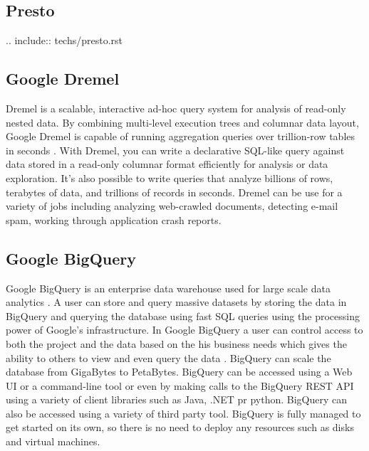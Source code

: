 \subsection{ Presto}

     .. include:: techs/presto.rst

\subsection{ Google Dremel}
 
     Dremel is a scalable, interactive ad-hoc query system for
     analysis of read-only nested data. By combining multi-level
     execution trees and columnar data layout, Google Dremel is
     capable of running aggregation queries over trillion-row tables
     in seconds \cite{paper-dremel}. With Dremel, you can write a
     declarative SQL-like query against data stored in a read-only
     columnar format efficiently for analysis or data exploration.
     It's also possible to write queries that analyze billions of
     rows, terabytes of data, and trillions of records in
     seconds. Dremel can be use for a variety of jobs including
     analyzing web-crawled documents, detecting e-mail spam, working
     through application crash reports.

\subsection{ Google BigQuery}


     Google BigQuery \cite{www-bigquery} is an enterprise data
     warehouse used for large scale data
     analytics \cite{www-bigquery-documentation}. A user can store
     and query massive datasets by storing the data in BigQuery and
     querying the database using fast SQL queries using the processing
     power of Google's infrastructure. In Google BigQuery a user can
     control access to both the project and the data based on the his
     business needs which gives the ability to others to view and even
     query the data \cite{www-bigquery}. BigQuery can scale the
     database from GigaBytes to PetaBytes. BigQuery can be accessed
     using a Web UI or a command-line tool or even by making calls to
     the BigQuery REST API using a variety of client libraries such as
     Java, .NET pr python. BigQuery can also be accessed using a
     variety of third party tool. BigQuery is fully managed to get
     started on its own, so there is no need to deploy any resources
     such as disks and virtual machines.

